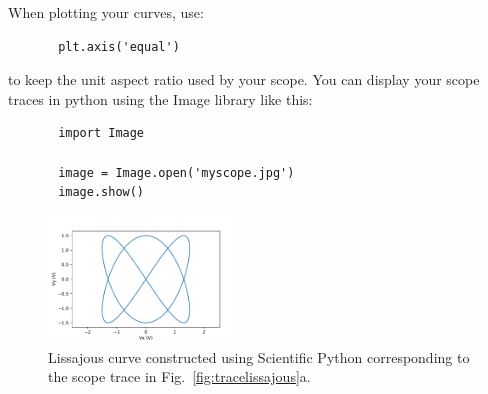 When plotting your curves, use:
\begin{verbatim}
       plt.axis('equal')
\end{verbatim}
to keep the unit aspect ratio used by your scope.
You can display your scope traces in python using the Image library like this:
\begin{verbatim}
       import Image

       image = Image.open('myscope.jpg')
       image.show()
\end{verbatim}

\begin{figure}[htbp]
\begin{center}
\includegraphics[width=0.45\textwidth]{figs/labs/lissajous/pythonlissajous.pdf} 
\caption{Lissajous curve constructed using Scientific Python corresponding to the scope trace in Fig.~\ref{fig:tracelissajous}a.}
\label{fig:pythonlissajous}
\end{center}
\end{figure}

